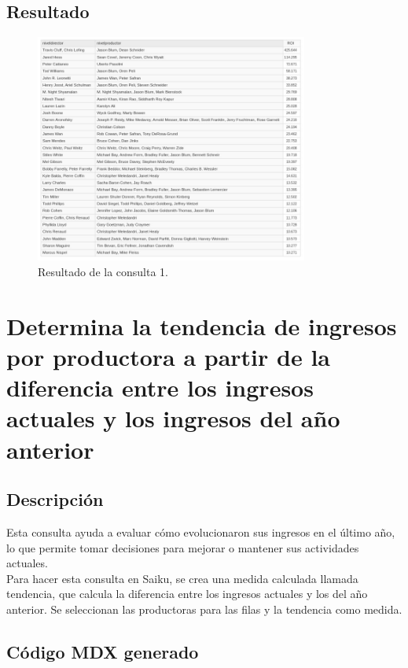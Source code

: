 \documentclass[11pt]{opticajnl}
\begin{document}
\newpage
\subsection{Resultado}
\begin{figure}[h]
\centering
\includegraphics[width=0.8\textwidth]{fotos/con1.jpg}
\caption{Resultado de la consulta 1.}
\end{figure}


\newpage

\section{Determina la tendencia de ingresos por productora a partir de la diferencia entre los ingresos actuales y los ingresos del año anterior}

\subsection{Descripción}

Esta consulta ayuda a evaluar cómo evolucionaron sus ingresos en el último año, lo que permite tomar decisiones para mejorar o mantener sus actividades actuales. \\

Para hacer esta consulta en Saiku, se crea una medida calculada llamada tendencia, que calcula la diferencia entre los ingresos actuales y los del año anterior. Se seleccionan las productoras para las filas y la tendencia como medida.

\subsection{Código MDX generado}
\end{document}
